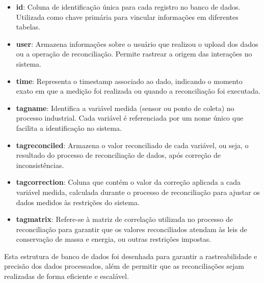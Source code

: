 \begin{itemize}
    \item \textbf{id}: Coluna de identificação única para cada registro no banco de dados. Utilizada como chave primária para vincular informações em diferentes tabelas.
    \item \textbf{user}: Armazena informações sobre o usuário que realizou o upload dos dados ou a operação de reconciliação. Permite rastrear a origem das interações no sistema.
    \item \textbf{time}: Representa o timestamp associado ao dado, indicando o momento exato em que a medição foi realizada ou quando a reconciliação foi executada.
    \item \textbf{tagname}: Identifica a variável medida (sensor ou ponto de coleta) no processo industrial. Cada variável é referenciada por um nome único que facilita a identificação no sistema.
    \item \textbf{tagreconciled}: Armazena o valor reconciliado de cada variável, ou seja, o resultado do processo de reconciliação de dados, após correção de inconsistências.
    \item \textbf{tagcorrection}: Coluna que contém o valor da correção aplicada a cada variável medida, calculada durante o processo de reconciliação para ajustar os dados medidos às restrições do sistema.
    \item \textbf{tagmatrix}: Refere-se à matriz de correlação utilizada no processo de reconciliação para garantir que os valores reconciliados atendam às leis de conservação de massa e energia, ou outras restrições impostas.
\end{itemize}

Esta estrutura de banco de dados foi desenhada para garantir a rastreabilidade e precisão dos dados processados, além de permitir que as reconciliações sejam realizadas de forma eficiente e escalável.